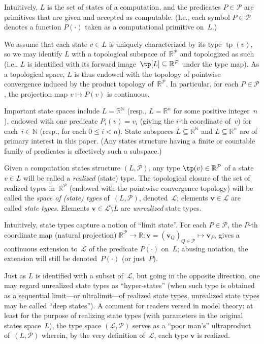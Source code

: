 Intuitively, $L$ is the set of states of a computation, and the predicates $P \in\mathcal{P}$ are primitives that are given and accepted as computable.
(I.e., each symbol $P\in \mathcal{P}$ denotes a function $P(\cdot)$ taken as a computational primitive on~$L$.)

We assume that each state $v\in L$ is uniquely characterized by its type $\operatorname{tp}(v)$, so we may identify $L$ with a topological subspace of~$\mathbb{R}^\mathcal{P}$ and topologized as such (i.e., $L$ is identified with its forward image~$\tp[L]\subseteq \mathbb{R}^{\mathcal{P}}$ under the type map).
As a topological space, $L$ is thus endowed with the topology of pointwise convergence induced by the product topology of~$\mathbb{R}^\mathcal{P}$.
In particular, for each $P\in \mathcal{P}$, the projection map $v\mapsto P(v)$ is continuous.

Important state spaces include $L=\mathbb{R}^\mathbb{N}$ (resp., $L=\mathbb{R}^n$ for some positive integer~$n$), endowed with one predicate $P_i(v) = v_i$ (giving the $i$-th coordinate of~$v$) for each~$i\in \mathbb{N}$ (resp., for each $0\le i<n$).
State subspaces $L\subseteq \mathbb{R}^{\mathbb{N}}$ and $L\subseteq \mathbb{R}^n$ are of primary interest in this paper.
(Any states structure having a finite or countable family of predicates is effectively such a subspace.)

\begin{definition}
Given a computation states structure $(L,\mathcal{P})$, any type $\tp(v)\in \mathbb{R}^{\mathcal{P}}$ of a state $v\in L$ will be called a \emph{realized} (state) type.
The topological closure of the set of realized types in~$\mathbb{R}^\mathcal{P}$ (endowed with the pointwise convergence topology) will be called the \emph{space of (state) types} of~$(L,\mathcal{P})$, denoted~$\mathcal{L}$;
elements $\mathbf{v}\in \mathcal{L}$ are called \emph{state types}.
Elements $\mathbf{v}\in\mathcal{L}\setminus L$ are \emph{unrealized} state types.
\end{definition}

Intuitively, state types capture a notion of ``limit state''.
For each $P\in \mathcal{P}$, the $P$-th coordinate map (natural projection) $\mathbb{R}^{\mathcal{P}}\to \mathbb{R}: \mathbf{v} = (\mathbf{v}_Q)_{Q\in \mathcal{P}}\mapsto \mathbf{v}_P$, gives a continuous extension to~$\mathcal{L}$ of the predicate $P(\cdot)$ on~$L$;
abusing notation, the extension will still be denoted~$P(\cdot)$ (or just~$P$).

\begin{remark}\label{rem:poor-mans-ultraprod}
    Just as $L$ is identified with a subset of~$\mathcal{L}$, but going in the opposite direction, one may regard unrealized state types as “hyper-states” (when such type is obtained as a sequential limit—or ultralimit—of realized state types, unrealized state types may be called “deep states”).
    A comment for readers versed in model theory: at least for the purpose of realizing state types (with parameters in the original states space~$L$), the type space $(\mathcal{L}, \mathcal{P})$ serves as a “poor man's” ultraproduct of~$(L, \mathcal{P})$ wherein, by the very definition of~$\mathcal{L}$, each type $\mathbf{v}$ is realized.
\end{remark}

